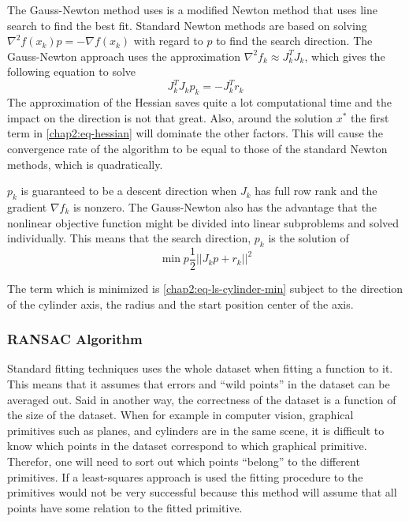 The Gauss-Newton method uses is a modified Newton method that uses line search to find the
best fit. Standard Newton methods are based on solving $\nabla^2 f(x_k) p = -\nabla
f(x_k)$ with regard to $p$ to find the search direction. The Gauss-Newton approach uses
the approximation $\nabla^2 f_k \approx  J_k^T J_k$, which gives the following equation to
solve
\begin{equation}
    J_k^T J_k p_k = - J_k^T r_k
\end{equation}
The approximation of the Hessian saves quite a lot computational time and the impact on
the direction is not that great. Also, around the solution $x^*$ the first term in
\eqref{chap2:eq-hessian} will dominate the other factors. This will cause the convergence
rate of the algorithm to be equal to those of the standard Newton methods, which is
quadratically. 

$p_k$ is guaranteed to be a descent direction when $J_k$ has full row rank and the
gradient $\nabla f_k$ is nonzero. The Gauss-Newton also has the advantage that the
nonlinear objective function might be divided into linear subproblems and solved
individually. This means that the search direction, $p_k$ is the solution of
\begin{equation}
    \min{p} \frac{1}{2} || J_k p + r_k ||^2
\end{equation}

The term which is minimized is \eqref{chap2:eq-ls-cylinder-min} subject to the direction
of the cylinder axis, the radius and the start position center of the axis. 


\subsubsection{RANSAC Algorithm}
Standard fitting techniques uses the whole dataset when fitting a function to it. This
means that it assumes that errors and ``wild points'' in the dataset can be averaged out.
Said in another way, the correctness of the dataset is a function of the size of the
dataset. When for example in computer vision, graphical primitives such as planes, and
cylinders are in the same scene, it is difficult to know which points in the dataset
correspond to which graphical primitive. Therefor, one will need to sort out which points
``belong'' to the different primitives. If a least-squares approach is used the fitting
procedure to the primitives would not be very successful because this method will assume
that all points have some relation to the fitted primitive. \cite{ransac}

